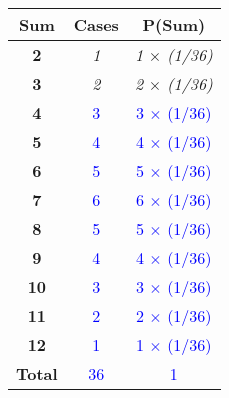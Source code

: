 \documentclass[convert]{standalone}
\begin{document}
    
\begin{tabular}{|c|c|c|}
\hline
\textbf{Sum}   & \textbf{Cases} & \textbf{P(Sum)} \\ \hline
\textbf{2}     & \textit{1}     & \textit{1 $\times$ (1/36)}     \\ \hline
\textbf{3}     & \textit{2}     & \textit{2 $\times$ (1/36)}     \\ \hline
\textbf{4}     & \textcolor{blue}{3}               &  \textcolor{blue}{3 $\times$ (1/36)}          \\ \hline
\textbf{5}     & \textcolor{blue}{4}               &  \textcolor{blue}{4 $\times$ (1/36)}          \\ \hline
\textbf{6}     & \textcolor{blue}{5}               &  \textcolor{blue}{5 $\times$ (1/36)}          \\ \hline
\textbf{7}     & \textcolor{blue}{6}               &  \textcolor{blue}{6 $\times$ (1/36)}          \\ \hline
\textbf{8}     & \textcolor{blue}{5}               &  \textcolor{blue}{5 $\times$ (1/36)}          \\ \hline
\textbf{9}     & \textcolor{blue}{4}               &  \textcolor{blue}{4 $\times$ (1/36)}          \\ \hline
\textbf{10}    & \textcolor{blue}{3}               &  \textcolor{blue}{3 $\times$ (1/36)}          \\ \hline
\textbf{11}    & \textcolor{blue}{2}               &  \textcolor{blue}{2 $\times$ (1/36)}          \\ \hline
\textbf{12}    & \textcolor{blue}{1}               &  \textcolor{blue}{1 $\times$ (1/36)}          \\ \hline
\textbf{Total} & \textcolor{blue}{36}               &  \textcolor{blue}{1}          \\ \hline
\end{tabular}
\end{document}

